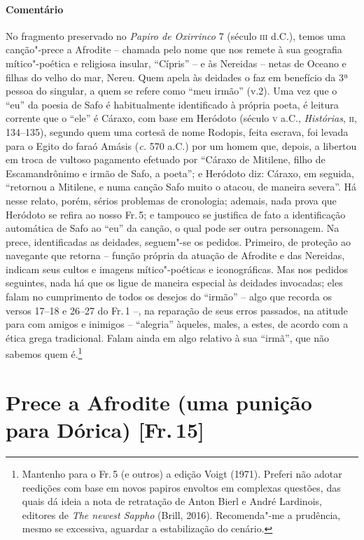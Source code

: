 \pagebreak
{\paragraph{Comentário} No fragmento preservado no \textit{Papiro de Oxirrinco} 7 (século \textsc{iii} d.C.),
temos uma canção"-prece a Afrodite -- chamada pelo nome que nos remete à sua
geografia mítico"-poética e religiosa insular, “Cípris” -- e às Nereidas
-- netas de Oceano e filhas do velho do mar, Nereu. Quem apela às deidades o faz
em benefício da 3ª pessoa do singular, a quem se refere como “meu
irmão” (v.2). Uma vez que o “eu” da poesia de Safo é habitualmente
identificado à própria poeta, é leitura corrente que o “ele” é Cáraxo, com base
em Heródoto (século \textsc{v} a.C., \textit{Histórias}, \textsc{ii}, 134--135), segundo quem uma
cortesã de nome Rodopis, feita escrava, foi levada para o Egito do faraó Amásis
(\textit{c.} 570 a.C.) por um homem que, depois, a libertou em troca de vultoso
pagamento efetuado por “Cáraxo de Mitilene, filho de Escamandrônimo e
irmão de Safo, a poeta”; e Heródoto diz: Cáraxo, em seguida, “retornou
a Mitilene, e numa canção Safo muito o atacou, de maneira severa”. Há nesse
relato, porém, sérios problemas de cronologia; ademais, nada prova que Heródoto se refira ao
nosso Fr.\,5; e tampouco se justifica de fato a identificação automática de
Safo ao “eu” da canção, o qual pode ser outra personagem.
Na prece, identificadas as deidades, seguem"-se os
pedidos. Primeiro, de proteção ao navegante que retorna -- função própria da
atuação de Afrodite e das Nereidas, indicam seus cultos e imagens
mítico"-poéticas e iconográficas. Mas nos pedidos seguintes, nada há que os
ligue de maneira especial às deidades invocadas; eles falam no
cumprimento de todos os desejos do “irmão” -- algo que recorda os
versos 17--18 e 26--27 do Fr.\,1 --, na reparação de seus erros passados, na
atitude para com amigos e inimigos -- “alegria” àqueles,
males, a estes, de acordo com a ética grega tradicional. Falam ainda em algo
relativo à sua ``irmã'', que não sabemos quem é.\footnote{Mantenho para o Fr.\,5 (e outros) a edição Voigt (1971). Preferi não adotar reedições com base em novos papiros envoltos em complexas questões, das quais dá ideia a nota de retratação de Anton Bierl e André Lardinois, editores de \textit{The newest Sappho} (Brill, 2016). Recomenda"-me a prudência, mesmo se excessiva, aguardar a estabilização do cenário.}}


\pagebreak
\section{Prece a Afrodite (uma punição para Dórica) [Fr.\,15]}

